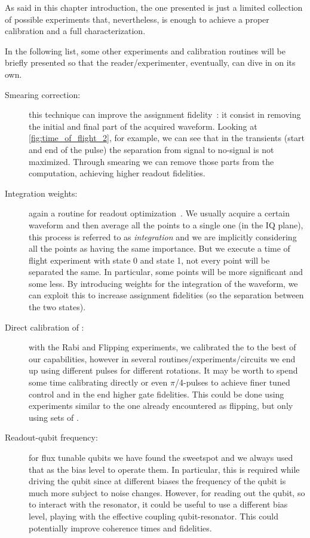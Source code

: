 
As said in this chapter introduction, the one presented is just a limited collection of possible experiments that, nevertheless, is enough to achieve a proper calibration and a full characterization.

In the following list, some other experiments and calibration routines will be briefly presented so that the reader/experimenter, eventually, can dive in on its own.


\begin{description}
    \item[Smearing correction:] this technique can improve the assignment fidelity~\cite{Krantz2016}: it consist in removing the initial and final part of the acquired waveform. Looking at \cref{fig:time_of_flight_2}, for example, we can see that in the transients (start and end of the pulse) the separation from signal to no-signal is not maximized. Through smearing we can remove those parts from the computation, achieving higher readout fidelities. 
    \item[Integration weights: ] again a routine for readout optimization~\cite{integration}. We usually acquire a certain waveform and then average all the points to a single one (in the IQ plane), this process is referred to as \textit{integration} and we are implicitly considering all the points as having the same importance. But we execute a time of flight experiment with state 0 and state 1, not every point will be separated the same. In particular, some points will be more significant and some less. By introducing weights for the integration of the waveform, we can exploit this to increase assignment fidelities (so the separation between the two states).
    \item[Direct calibration of \pihpulses:] with the Rabi and Flipping experiments, we calibrated the \pipulses to the best of our capabilities, however in several routines/experiments/circuits we end up using different pulses for different rotations. It may be worth to spend some time calibrating directly \pihpulses or even $\pi$/4-pulses to achieve finer tuned control and in the end higher gate fidelities. This could be done using experiments similar to the one already encountered as flipping, but only using sets of \pihpulses.
    \item[Readout-qubit frequency:] for flux tunable qubits we have found the sweetspot and we always used that as the bias level to operate them. In particular, this is required while driving the qubit since at different biases the frequency of the qubit is much more subject to noise changes. However, for reading out the qubit, so to interact with the resonator, it could be useful to use a different bias level, playing with the effective coupling qubit-resonator. This could potentially improve coherence times and fidelities.

\end{description}

